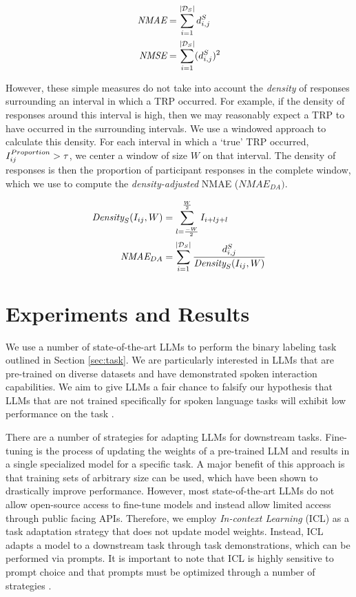\begin{align}
    \textit{NMAE} & = \sum_{i=1}^{|\mathcal{D}_{S}|} d_{i,j}^{S}     \\
    \textit{NMSE} & = \sum_{i=1}^{|\mathcal{D}_{S}|} (d_{i,j}^{S})^2
\end{align}

However, these simple measures do not take into account the \emph{density} of responses surrounding an interval in which a TRP occurred. For example, if the density of responses around this interval is high, then we may reasonably expect a TRP to have occurred in the surrounding intervals. We use a windowed approach to calculate this density. For each interval in which a `true' TRP occurred, $I_{ij}^{Proportion} > \tau$, we center a window of size $W$ on that interval. The density of responses is then the proportion of participant responses in the complete window, which we use to compute the \emph{density-adjusted} NMAE ($\textit{NMAE}_{DA})$.

\begin{align}
    \textit{Density}_S(I_{ij}, W) & = \sum_{l=\frac{-W}{2}}^{\frac{W}{2}} I_{i+lj+l}                                    \\
    \textit{NMAE}_{DA}                     & = \sum_{i=1}^{|\mathcal{D}_{S}|} \frac{d_{i,j}^{S}}{\textit{Density}_S(I_{ij},W)}
\end{align}


\section{Experiments and Results}

We use a number of state-of-the-art LLMs to perform the binary labeling task outlined in Section \ref{sec:task}. We are particularly interested in LLMs that are pre-trained on diverse datasets and have demonstrated spoken interaction capabilities. We aim to give LLMs a fair chance to falsify our hypothesis that LLMs that are not trained specifically for spoken language tasks will exhibit low performance on the task \cite{yang2024harnessing, lin2024advancing}.

There are a number of strategies for adapting LLMs for downstream tasks. Fine-tuning is the process of updating the weights of a pre-trained LLM and results in a single specialized model for a specific task. A major benefit of this approach is that training sets of arbitrary size can be used, which have been shown to drastically improve performance. However, most state-of-the-art LLMs do not allow open-source access to fine-tune models \cite{liesenfeld2024rethinking} and instead allow limited access through public facing APIs. Therefore, we employ \emph{In-context Learning} (ICL) as a task adaptation strategy that does not update model weights. Instead, ICL adapts a model to a downstream task through task demonstrations, which can be performed via prompts. It is important to note that ICL is highly sensitive to prompt choice and that prompts must be optimized through a number of strategies \cite{chang2024efficient}.


